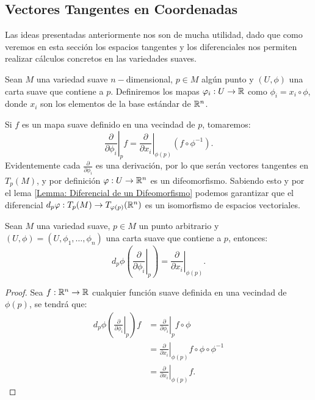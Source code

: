 \subsection{Vectores Tangentes en Coordenadas}\label{Subsección: Espacios Tangentes en Coordenadas}
Las ideas presentadas anteriormente nos son de mucha utilidad, dado que como veremos en esta sección los espacios tangentes y los diferenciales nos permiten realizar cálculos concretos en las variedades suaves.

Sean $M$ una variedad suave $n-$dimensional, $p \in M$ algún punto y $(U,\phi)$ una carta suave que contiene a $p$. Definiremos los mapas $\varphi_i: U \to \mathbb{R}$ como $\phi_{i} = x_i \circ \phi$, donde $x_i$ son los elementos de la base estándar de $\mathbb{R}^n$.

Si $f$ es un mapa suave definido en una vecindad de $p$, tomaremos:
\[
	\left.
	\frac{\partial}{\partial \phi_i}
	\right|_{p} f
	=
	\left.
	\frac{\partial}{\partial x_i}
	\right|_{\phi(p)}
	\left( f \circ \phi^{-1} \right).
\]
Evidentemente cada $\frac{\partial}{\partial \phi_i}$ es una derivación, por lo que serán vectores tangentes en $T_p(M)$, y por definición $\varphi: U \to \mathbb{R}^n$ es un difeomorfismo. Sabiendo esto y por el lema \ref{Lemma: Diferencial de un Difeomorfismo} podemos garantizar que el diferencial $d_p\varphi: T_p(M) \to T_{\varphi(p)}(\mathbb{R}^n)$ es un isomorfismo de espacios vectoriales.

\begin{lemma}\label{Lemma: Definicion Vector Coordenado}
	Sean $M$ una variedad suave, $p \in M$ un punto arbitrario y $(U,\phi) = (U, \phi_1, \dots, \phi_n)$ una carta suave que contiene a $p$, entonces:
	\[
		d_p\phi \left( \left. \frac{\partial }{\partial \phi_i}\right|_{p}\right)
    = \left. \frac{\partial}{\partial x_i} \right|_{\phi(p)}.
	\]
\end{lemma}

\begin{proof}
	Sea $f: \mathbb{R}^n \to \mathbb{R}$ cualquier función suave definida en una vecindad de $\phi(p)$, se tendrá que:
	\begin{align*}
		d_p\phi \left( \left. \frac{\partial}{\partial \phi_i} \right|_{p} \right) f
		 & = \left. \frac{\partial}{\partial \phi_i} \right|_{p}
		f \circ \phi                                                  \\
		 & = \left. \frac{\partial}{\partial x_i} \right|_{\phi(p)}
		f \circ \phi \circ \phi^{-1}                                  \\
		 & = \left. \frac{\partial}{\partial x_i}\right|_{\phi(p)} f.
	\end{align*}
\end{proof}

